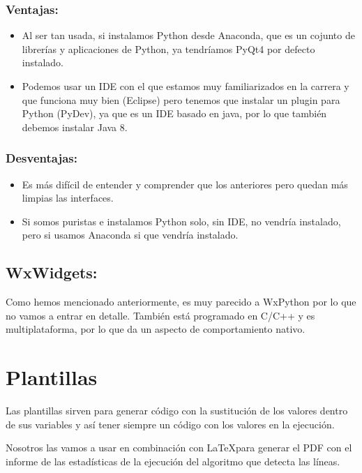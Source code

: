 \subsubsection{Ventajas:}

\begin{itemize}
\item Al ser tan usada, si instalamos Python desde Anaconda, que es un cojunto de librerías y aplicaciones de Python, ya tendríamos PyQt4 por defecto instalado.

\item Podemos usar un IDE con el que estamos muy familiarizados en la carrera y que funciona muy bien (Eclipse) pero tenemos que instalar un plugin para Python (PyDev), ya que es un IDE basado en java, por lo que también debemos instalar Java 8.
\end{itemize}

\subsubsection{Desventajas:}

\begin{itemize}
\item Es más difícil de entender y comprender que los anteriores pero quedan más limpias las interfaces.
\item Si somos puristas e instalamos Python solo, sin IDE, no vendría instalado, pero si usamos Anaconda si que vendría instalado.
\end{itemize}

\subsection{WxWidgets:}
Como hemos mencionado anteriormente, es muy parecido a WxPython por lo que no vamos a entrar en detalle. También está programado en C/C++ y es multiplataforma, por lo que da un aspecto de comportamiento nativo.



\section{Plantillas}
Las plantillas sirven para generar código con la sustitución de los valores dentro de sus variables y así tener siempre un código con los valores en la ejecución.

Nosotros las vamos a usar en combinación con \LaTeX para generar el PDF con el informe de las estadísticas de la ejecución del algoritmo que detecta las líneas.

